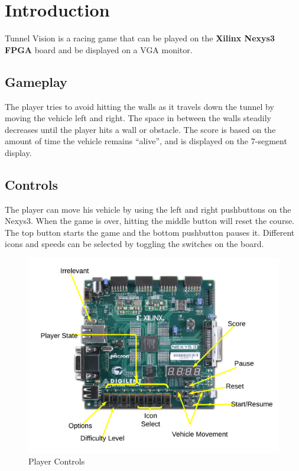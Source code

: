 \documentclass[11pt]{article}
\begin{document}


\section{Introduction} 
Tunnel Vision is a racing game that can be played on the \textbf{Xilinx Nexys3 FPGA} board and be displayed on a VGA monitor.

\subsection{Gameplay}
The player tries to avoid hitting the walls as it travels down the tunnel by moving the vehicle left and right. The space in between the walls steadily decreases until the player hits a wall or obstacle. The score is based on the amount of time the vehicle remains ``alive'', and is displayed on the 7-segment display.

\subsection{Controls}
The player can move his vehicle by using the left and right pushbuttons on the Nexys3. When the game is over, hitting the middle button will reset the course. The top button starts the game and the bottom pushbutton pauses it. Different icons and speeds can be selected by toggling the switches on the board.

		\begin{figure}[h]\centering
		\includegraphics[height=0.8\textwidth, width=0.8\textheight]{Images/controls_mockup.png}
		\caption{Player Controls}
			\label{controls}
		\end{figure}	
	 	
\end{document}
